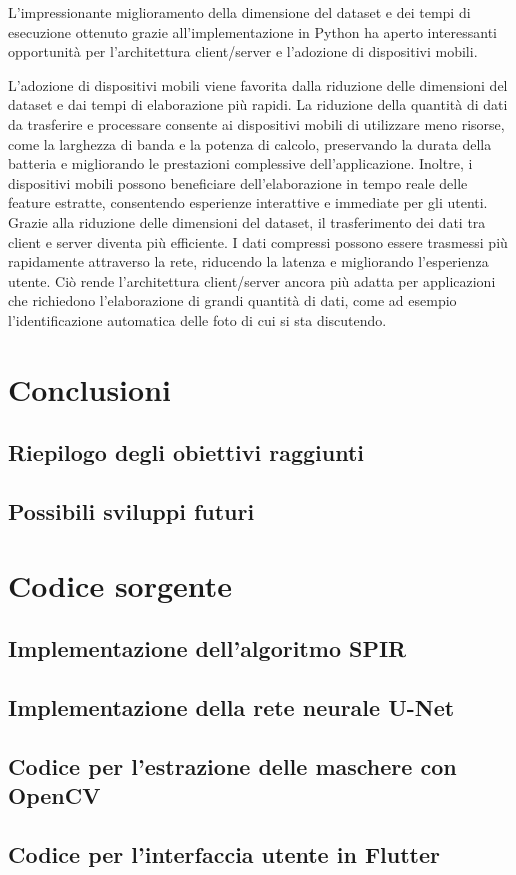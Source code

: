 \documentclass[a4paper,12pt]{report}
\begin{document}
    L'impressionante miglioramento della dimensione del dataset e dei tempi di esecuzione ottenuto grazie all'implementazione in Python ha aperto interessanti opportunità per l'architettura client/server e l'adozione di dispositivi mobili.

    L'adozione di dispositivi mobili viene favorita dalla riduzione delle dimensioni del dataset e dai tempi di elaborazione più rapidi. La riduzione della quantità di dati da trasferire e processare consente ai dispositivi mobili di utilizzare meno risorse, come la larghezza di banda e la potenza di calcolo, preservando la durata della batteria e migliorando le prestazioni complessive dell'applicazione. Inoltre, i dispositivi mobili possono beneficiare dell'elaborazione in tempo reale delle feature estratte, consentendo esperienze interattive e immediate per gli utenti.
    Grazie alla riduzione delle dimensioni del dataset, il trasferimento dei dati tra client e server diventa più efficiente. I dati compressi possono essere trasmessi più rapidamente attraverso la rete, riducendo la latenza e migliorando l'esperienza utente. Ciò rende l'architettura client/server ancora più adatta per applicazioni che richiedono l'elaborazione di grandi quantità di dati, come ad esempio l'identificazione automatica delle foto di cui si sta discutendo.
\chapter{Conclusioni}
  \section{Riepilogo degli obiettivi raggiunti}
  \section{Possibili sviluppi futuri}

\chapter{Codice sorgente}
  \section{Implementazione dell'algoritmo SPIR}
  \section{Implementazione della rete neurale U-Net}
  \section{Codice per l'estrazione delle maschere con OpenCV}
  \section{Codice per l'interfaccia utente in Flutter}

  
  
\end{document}
